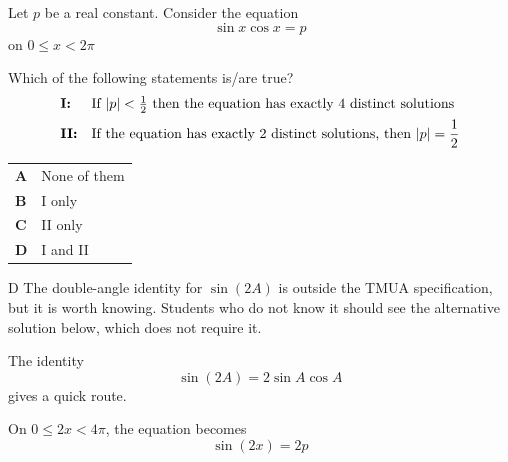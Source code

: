 \documentclass[11pt,a4paper]{article}
\begin{document}
\begin{enumerate}[label=\textbf{\arabic*.},leftmargin=*,itemsep=0pt,start=5]
\questionitem[Trigonometry]
Let $p$ be a real constant. Consider the equation \[\sin x \cos x = p\] on $0 \le x < 2\pi$

Which of the following statements is/are true? \[ \begin{array}{@{}l l@{}}
\textbf{I:} & \text{If } |p|<\tfrac12 \text{ then the equation has exactly 4 distinct solutions} \\[5pt]
\textbf{II:} & \text{If the equation has exactly 2 distinct solutions, then } |p|=\dfrac12
\end{array} \]

\par\vspace*{12pt}
\begin{tabularx}{\linewidth}{@{}>{\bfseries}l Y@{}}
A &
None of them
\\[0.8em]
B &
I only
\\[0.8em]
C &
II only
\\[0.8em]
D &
I and II
\\
\end{tabularx}

\begin{djsSolution}{D}
The double-angle identity for $\sin(2A)$ is outside the TMUA specification, but it is worth knowing. Students who do not know it should see the alternative solution below, which does not require it.

The identity \[\sin(2A)=2\sin A\cos A\] gives a quick route.

On $0\le 2x<4\pi$, the equation becomes
\[
\sin(2x)=2p
\]


\end{djsSolution}
\end{enumerate}
\end{document}
